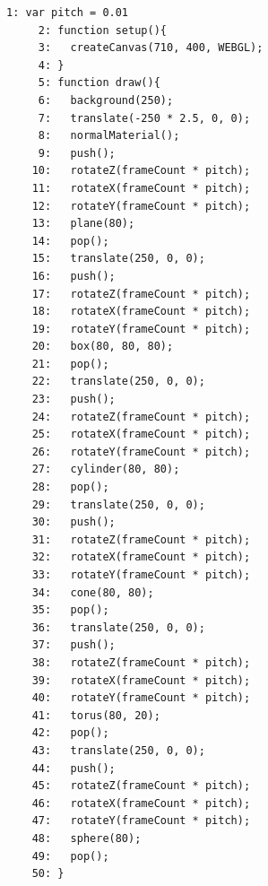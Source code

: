 \documentclass[a4j]{ltjsarticle}
\begin{document}
\vspace{1in}
\begin{lstlisting}[caption=Ex\_13\_01.js]
     1: var pitch = 0.01
     2: function setup(){
     3:   createCanvas(710, 400, WEBGL);
     4: }
     5: function draw(){
     6:   background(250); 
     7:   translate(-250 * 2.5, 0, 0);
     8:   normalMaterial();
     9:   push();
    10:   rotateZ(frameCount * pitch);
    11:   rotateX(frameCount * pitch);
    12:   rotateY(frameCount * pitch);
    13:   plane(80);
    14:   pop();
    15:   translate(250, 0, 0);
    16:   push(); 
    17:   rotateZ(frameCount * pitch);
    18:   rotateX(frameCount * pitch);
    19:   rotateY(frameCount * pitch);
    20:   box(80, 80, 80);
    21:   pop();
    22:   translate(250, 0, 0);
    23:   push();
    24:   rotateZ(frameCount * pitch);
    25:   rotateX(frameCount * pitch);
    26:   rotateY(frameCount * pitch);
    27:   cylinder(80, 80);
    28:   pop();
    29:   translate(250, 0, 0);
    30:   push();
    31:   rotateZ(frameCount * pitch);
    32:   rotateX(frameCount * pitch);
    33:   rotateY(frameCount * pitch);
    34:   cone(80, 80);
    35:   pop();
    36:   translate(250, 0, 0);
    37:   push();
    38:   rotateZ(frameCount * pitch);
    39:   rotateX(frameCount * pitch);
    40:   rotateY(frameCount * pitch);
    41:   torus(80, 20);
    42:   pop();
    43:   translate(250, 0, 0);
    44:   push();
    45:   rotateZ(frameCount * pitch);
    46:   rotateX(frameCount * pitch);
    47:   rotateY(frameCount * pitch);
    48:   sphere(80);
    49:   pop();
    50: }
\end{lstlisting}
\vspace{1in}
\end{document}
